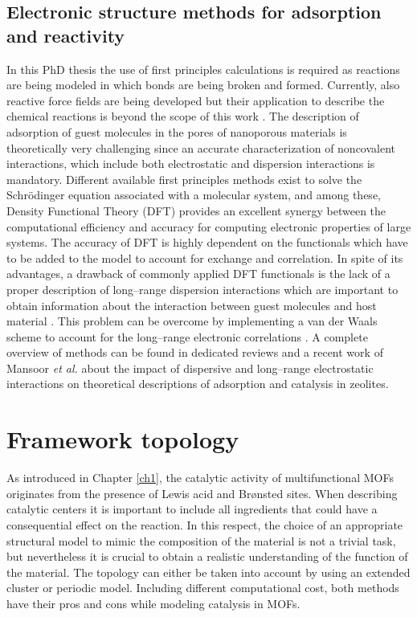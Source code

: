 \subsection*{Electronic structure methods for adsorption and reactivity}
In this PhD thesis the use of first principles calculations is required as
reactions are being modeled in which bonds are being broken and formed. Currently, also reactive force fields are being developed but their application to describe the chemical reactions is
beyond the scope of this work \cite{Han2010, Huang2013}. The description of
adsorption of guest molecules in the pores of nanoporous materials is theoretically very challenging since an
accurate characterization of noncovalent interactions, which include both
electrostatic and dispersion interactions is mandatory. Different available first principles
methods exist to solve the Schr\"{o}dinger equation associated with a molecular
system, and among these, Density Functional Theory (DFT) provides an excellent
synergy between the computational efficiency and accuracy for computing
electronic properties of large systems. The accuracy of DFT is highly dependent
on the functionals which have to be added to the model to account for exchange
and correlation.
In spite of its advantages, a drawback of commonly applied DFT functionals is
the lack of a proper description of long--range dispersion interactions which
are important to obtain information about the interaction between guest
molecules and host material \cite{Sauer1994}. This problem can be overcome by
implementing a van der Waals scheme to account for the long--range electronic
correlations \cite{Grimme2004}. A complete overview of methods can be found in
dedicated reviews \cite{Sholl2006, Mardirossian2014} and a recent work of Mansoor \textit{et al.}\cite{Mansoor2018} about the impact of dispersive and long--range electrostatic interactions on theoretical
descriptions of adsorption and catalysis in zeolites.


\section{Framework topology}
As introduced in Chapter \ref{ch1}, the catalytic activity of multifunctional
MOFs originates from the presence of Lewis acid and Br\o{}nsted sites.
When describing catalytic centers it is important to include all ingredients that could have a
consequential effect on the reaction. In this respect, the choice of an
appropriate structural model to mimic the composition of the material is not
a trivial task, but nevertheless it is crucial to obtain a realistic
understanding of the function of the material. The topology can either be taken
into account by using an extended cluster or periodic model.
Including different computational cost, both methods have their pros and cons
while modeling catalysis in MOFs. 

